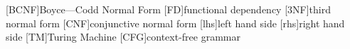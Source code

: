 \begin{acronym}[]
  [BCNF]{Boyce---Codd Normal Form}
  [FD]{functional dependency}
  [3NF]{third normal form}
  [CNF]{conjunctive normal form}
  [lhs]{left hand side}
  [rhs]{right hand side}
  [TM]{Turing Machine}
  [CFG]{context-free grammar}
\end{acronym}
